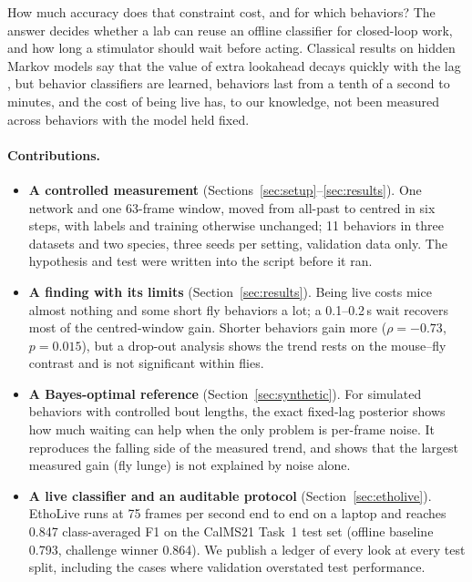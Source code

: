 \documentclass[10pt]{article}
\begin{document}
How much accuracy does that constraint cost, and for which behaviors? The answer decides whether a lab can reuse an offline classifier for closed-loop work, and how long a stimulator should wait before acting. Classical results on hidden Markov models say that the value of extra lookahead decays quickly with the lag \citep{shue1998exponential,venkat2016lookahead}, but behavior classifiers are learned, behaviors last from a tenth of a second to minutes, and the cost of being live has, to our knowledge, not been measured across behaviors with the model held fixed.

\paragraph{Contributions.}
\begin{itemize}
  \item \textbf{A controlled measurement} (Sections~\ref{sec:setup}--\ref{sec:results}). One network and one 63-frame window, moved from all-past to centred in six steps, with labels and training otherwise unchanged; 11 behaviors in three datasets and two species, three seeds per setting, validation data only. The hypothesis and test were written into the script before it ran.
  \item \textbf{A finding with its limits} (Section~\ref{sec:results}). Being live costs mice almost nothing and some short fly behaviors a lot; a 0.1--0.2\,s wait recovers most of the centred-window gain. Shorter behaviors gain more ($\rho=-0.73$, $p=0.015$), but a drop-out analysis shows the trend rests on the mouse--fly contrast and is not significant within flies.
  \item \textbf{A Bayes-optimal reference} (Section~\ref{sec:synthetic}). For simulated behaviors with controlled bout lengths, the exact fixed-lag posterior shows how much waiting can help when the only problem is per-frame noise. It reproduces the falling side of the measured trend, and shows that the largest measured gain (fly lunge) is not explained by noise alone.
  \item \textbf{A live classifier and an auditable protocol} (Section~\ref{sec:etholive}). EthoLive runs at 75 frames per second end to end on a laptop and reaches 0.847 class-averaged F1 on the CalMS21 Task~1 test set (offline baseline 0.793, challenge winner 0.864). We publish a ledger of every look at every test split, including the cases where validation overstated test performance.
\end{itemize}
\end{document}
